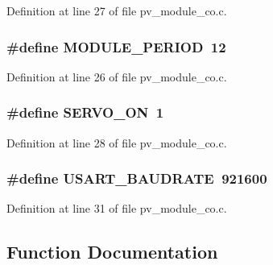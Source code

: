 Definition at line 27 of file pv\+\_\+module\+\_\+co.\+c.

\subsubsection[{\texorpdfstring{M\+O\+D\+U\+L\+E\+\_\+\+P\+E\+R\+I\+OD}{MODULE_PERIOD}}]{\setlength{\rightskip}{0pt plus 5cm}\#define M\+O\+D\+U\+L\+E\+\_\+\+P\+E\+R\+I\+OD~12}\hypertarget{group__app__co_ga0ac6c9f2991b096e49c354e5cce6fae0}{}\label{group__app__co_ga0ac6c9f2991b096e49c354e5cce6fae0}


Definition at line 26 of file pv\+\_\+module\+\_\+co.\+c.

\subsubsection[{\texorpdfstring{S\+E\+R\+V\+O\+\_\+\+ON}{SERVO_ON}}]{\setlength{\rightskip}{0pt plus 5cm}\#define S\+E\+R\+V\+O\+\_\+\+ON~1}\hypertarget{group__app__co_ga162e9e4abd94f1558733bbf17fca28e9}{}\label{group__app__co_ga162e9e4abd94f1558733bbf17fca28e9}


Definition at line 28 of file pv\+\_\+module\+\_\+co.\+c.

\subsubsection[{\texorpdfstring{U\+S\+A\+R\+T\+\_\+\+B\+A\+U\+D\+R\+A\+TE}{USART_BAUDRATE}}]{\setlength{\rightskip}{0pt plus 5cm}\#define U\+S\+A\+R\+T\+\_\+\+B\+A\+U\+D\+R\+A\+TE~921600}\hypertarget{group__app__co_ga6a53a6c94a70cc286e300a0ea8f46ba4}{}\label{group__app__co_ga6a53a6c94a70cc286e300a0ea8f46ba4}


Definition at line 31 of file pv\+\_\+module\+\_\+co.\+c.



\subsection{Function Documentation}

